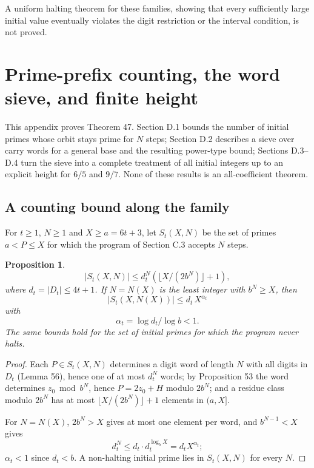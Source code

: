 \documentclass[11pt,reqno]{amsart}
\newtheorem{proposition}[theorem]{Proposition}
\theoremstyle{definition}
\theoremstyle{remark}
\begin{document}
A uniform halting theorem for these families, showing that every
sufficiently large initial value eventually violates the digit
restriction or the interval condition, is not proved.

\section{Prime-prefix counting, the word sieve, and finite height}\label{app:D}

This appendix proves Theorem 47. Section D.1 bounds the number of
initial primes whose orbit stays prime for \(N\) steps; Section D.2
describes a sieve over carry words for a general base and the resulting
power-type bound; Sections D.3--D.4 turn the sieve into a complete
treatment of all initial integers up to an explicit height for \(6/5\)
and \(9/7\). None of these results is an all-coefficient theorem.

\subsection{A counting bound along the family}\label{sec:D.1}

For \(t\ge1\), \(N\ge1\) and \(X\ge a=6t+3\), let \(S_t(X,N)\) be the
set of primes \(a<P\le X\) for which the program of Section C.3 accepts
\(N\) steps.

\begin{samepage}
\begin{proposition}\leavevmode\label{thm:63}
\[
|S_t(X,N)|\le d_t^N(\lfloor X/(2b^N)\rfloor+1),
\]
where \(d_t=|D_t|\le4t+1\). If \(N=N(X)\) is the least integer with
\(b^N\ge X\), then
\[
|S_t(X,N(X))|\le d_t\,X^{\alpha_t}
\]
with
\[
\alpha_t=\log d_t/\log b<1.
\]
The same bounds hold for the set of
initial primes for which the program never halts.
\label{thm-end:63}
\end{proposition}
\end{samepage}

\begin{proof}\leavevmode\label{proof:63}
Each \(P\in S_t(X,N)\) determines a digit word of length
\(N\) with all digits in \(D_t\) (Lemma 56), hence one of at most
\(d_t^N\) words; by Proposition 53 the word determines
\(z_0\bmod b^N\), hence \(P=2z_0+H\) modulo \(2b^N\); and a residue class
modulo \(2b^N\) has at most \(\lfloor X/(2b^N)\rfloor+1\) elements in
\((a,X]\).

For \(N=N(X)\), \(2b^N>X\) gives at most one element per
word, and \(b^{N-1}<X\) gives
\[
d_t^N\le d_t\cdot d_t^{\log_bX}
=d_tX^{\alpha_t};
\]
\(\alpha_t<1\) since \(d_t<b\). A non-halting
initial prime lies in \(S_t(X,N)\) for every \(N\). \qedhere
\end{proof}
\end{document}
